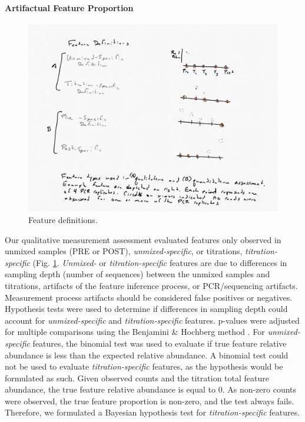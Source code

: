 \documentclass[linenumbers]{bmcart}
\begin{document}
\paragraph{Artifactual Feature Proportion}
\begin{figure}
\centering
\includegraphics{feature_definitions.png}
\caption{\label{fig:featureDefinitions} Feature definitions.}
\end{figure}

Our qualitative measurement assessment evaluated features only observed
in unmixed samples (PRE or POST), \emph{unmixed-specific}, or
titrations, \emph{titration-specific} (Fig.
\ref{fig:featureDefinitions}. \emph{Unmixed-} or
\emph{titration-specific} features are due to differences in sampling
depth (number of sequences) between the unmixed samples and titrations,
artifacts of the feature inference process, or PCR/sequencing artifacts.
Measurement process artifacts should be considered false positives or
negatives. Hypothesis tests were used to determine if differences in
sampling depth could account for \emph{unmixed-specific} and
\emph{titration-specific} features. p-values were adjusted for multiple
comparisons using the Benjamini \& Hochberg method
\cite{benjamini1995controlling}. For \emph{unmixed-specific} features,
the binomial test was used to evaluate if true feature relative
abundance is less than the expected relative abundance. A binomial test
could not be used to evaluate \emph{titration-specific} features, as the
hypothesis would be formulated as such. Given observed counts and the
titration total feature abundance, the true feature relative abundance
is equal to 0. As non-zero counts were observed, the true feature
proportion is non-zero, and the test always fails. Therefore, we
formulated a Bayesian hypothesis test for \emph{titration-specific}
features.
\end{document}
